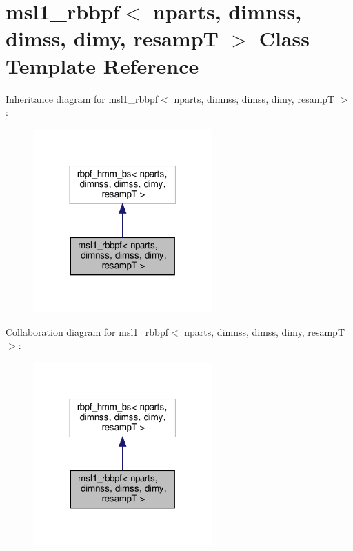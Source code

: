 \hypertarget{classmsl1__rbbpf}{}\section{msl1\+\_\+rbbpf$<$ nparts, dimnss, dimss, dimy, resampT $>$ Class Template Reference}
\label{classmsl1__rbbpf}


Inheritance diagram for msl1\+\_\+rbbpf$<$ nparts, dimnss, dimss, dimy, resampT $>$\+:
\nopagebreak
\begin{figure}[H]
\begin{center}
\leavevmode
\includegraphics[width=195pt]{classmsl1__rbbpf__inherit__graph}
\end{center}
\end{figure}


Collaboration diagram for msl1\+\_\+rbbpf$<$ nparts, dimnss, dimss, dimy, resampT $>$\+:
\nopagebreak
\begin{figure}[H]
\begin{center}
\leavevmode
\includegraphics[width=195pt]{classmsl1__rbbpf__coll__graph}
\end{center}
\end{figure}
